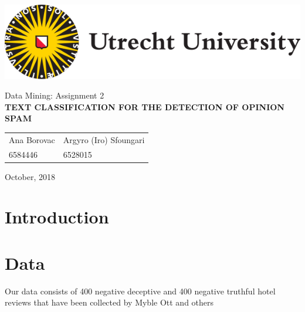 \documentclass[a4paper,11pt]{article}
\begin{document}
\thispagestyle{empty}

\includegraphics[scale=0.35]{UUlogo.png}

\vspace{50mm}

\begin{center}
\begin{large}
Data Mining: Assignment 2 \\[3mm]
\textbf{
\uppercase{Text Classification for the Detection of Opinion Spam}} \\[25mm]
\end{large}

\begin{tabularx}{\textwidth}{YY}
Ana Borovac & Argyro (Iro) Sfoungari \\
6584446 & 6528015
\end{tabularx}
\end{center}

\vfill

October, 2018

\newpage

\tableofcontents

\vspace{3cm}

\begin{abstract}
\end{abstract}

\newpage

\section{Introduction}

\section{Data}
Our data consists of 400 negative deceptive and 400 negative truthful hotel reviews that have been collected by Myble Ott and others %
\end{document}
